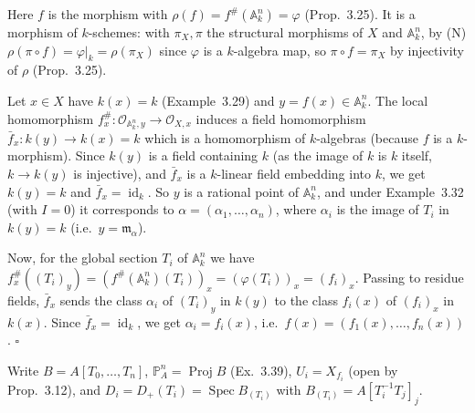 \documentclass[11pt]{article}
\begin{document}
\pf
Here $f$ is the morphism with $\rho(f)=f^{\#}(\mathbb{A}^n_k)=\varphi$ (Prop.~3.25). It is a morphism of $k$-schemes: with $\pi_X,\pi$ the structural morphisms of $X$ and $\mathbb{A}^n_k$, by (N) $\rho(\pi\circ f)=\varphi|_k=\rho(\pi_X)$ since $\varphi$ is a $k$-algebra map, so $\pi\circ f=\pi_X$ by injectivity of $\rho$ (Prop.~3.25).

Let $x\in X$ have $k(x)=k$ (Example~3.29) and $y=f(x)\in\mathbb{A}^n_k$. The local homomorphism $f^{\#}_x:\mathcal{O}_{\mathbb{A}^n_k,y}\to\mathcal{O}_{X,x}$ induces a field homomorphism $\bar f_x:k(y)\to k(x)=k$ which is a homomorphism of $k$-algebras (because $f$ is a $k$-morphism). Since $k(y)$ is a field containing $k$ (as the image of $k$ is $k$ itself, $k\to k(y)$ is injective), and $\bar f_x$ is a $k$-linear field embedding into $k$, we get $k(y)=k$ and $\bar f_x=\operatorname{id}_k$. So $y$ is a rational point of $\mathbb{A}^n_k$, and under Example~3.32 (with $I=0$) it corresponds to $\alpha=(\alpha_1,\dots,\alpha_n)$, where $\alpha_i$ is the image of $T_i$ in $k(y)=k$ (i.e.\ $y=\mathfrak{m}_\alpha$).

Now, for the global section $T_i$ of $\mathbb{A}^n_k$ we have $f^{\#}_x((T_i)_y)=(f^{\#}(\mathbb{A}^n_k)(T_i))_x=(\varphi(T_i))_x=(f_i)_x$. Passing to residue fields, $\bar f_x$ sends the class $\alpha_i$ of $(T_i)_y$ in $k(y)$ to the class $f_i(x)$ of $(f_i)_x$ in $k(x)$. Since $\bar f_x=\operatorname{id}_k$, we get $\alpha_i=f_i(x)$, i.e.\ $f(x)=(f_1(x),\dots,f_n(x))$. \hfill$\square$

\pf
Write $B=A[T_0,\dots,T_n]$, $\mathbb{P}^n_A=\operatorname{Proj}B$ (Ex.~3.39), $U_i=X_{f_i}$ (open by Prop.~3.12), and $D_i=D_+(T_i)=\operatorname{Spec}B_{(T_i)}$ with $B_{(T_i)}=A[T_i^{-1}T_j]_j$.
\end{document}
